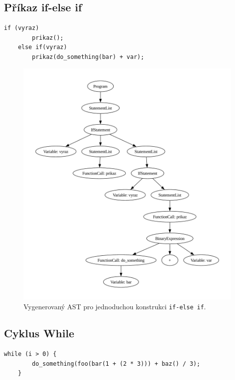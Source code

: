 \subsection*{Příkaz if-else if}
\begin{lstlisting}[language=Koubp]
    if (vyraz)
        prikaz();
    else if(vyraz)
        prikaz(do_something(bar) + var);
\end{lstlisting}
\begin{figure}[ht]
    \centering
    \includegraphics[width=\textwidth]{obrazky-figures/ast_if_else_if.pdf}
    \caption{Vygenerovaný AST pro jednoduchou konstrukci \texttt{if-else if}.}
    \label{fig_ast_else_if}
\end{figure}

\newpage

\subsection*{Cyklus While}

\begin{lstlisting}[language=Koubp]
	while (i > 0) {
		do_something(foo(bar(1 + (2 * 3))) + baz() / 3);
	}
\end{lstlisting}

